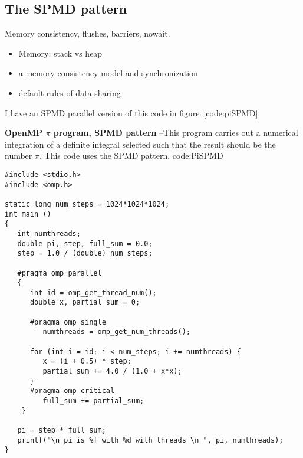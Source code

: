 \subsection{The SPMD pattern}
\label{sec:patternsSPMD}

Memory consistency, flushes, barriers, nowait.

 
\begin{itemize}
\item Memory: stack vs heap
\item a memory consistency model and synchronization
\item default rules of data sharing
\end{itemize}




I have an SPMD parallel version of this code in figure~\ref{code:piSPMD}.
 

 
\begin{CodeExample}%
{\textbf{OpenMP $\pi$ program, SPMD pattern} --\small This program carries out a numerical integration 
of a definite integral selected such that the result should be the number $\pi$.  This code uses the 
SPMD pattern.
}%
{code:PiSPMD}
\begin{lstlisting}
#include <stdio.h>
#include <omp.h>

static long num_steps = 1024*1024*1024;
int main ()
{
   int numthreads;
   double pi, step, full_sum = 0.0;
   step = 1.0 / (double) num_steps;

   #pragma omp parallel 
   {
      int id = omp_get_thread_num();
      double x, partial_sum = 0;

      #pragma omp single
         numthreads = omp_get_num_threads();

      for (int i = id; i < num_steps; i += numthreads) {
         x = (i + 0.5) * step;
         partial_sum += 4.0 / (1.0 + x*x);
      }
      #pragma omp critical
         full_sum += partial_sum;
    }
      
   pi = step * full_sum;
   printf("\n pi is %f with %d with threads \n ", pi, numthreads);
}	  

\end{lstlisting}
\end{CodeExample}


